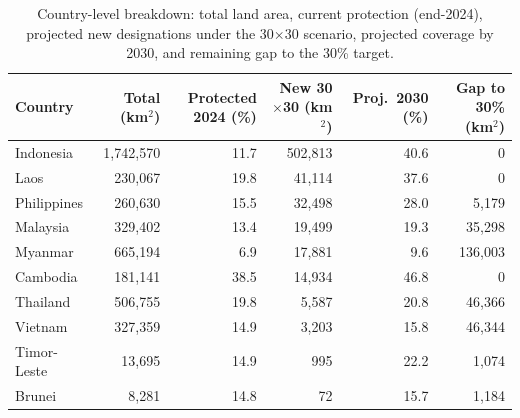 \begin{table}[htbp]
  \centering
  \small
  \caption{Country-level breakdown: total land area, current protection (end-2024), projected new designations under the 30$\times$30 scenario, projected coverage by 2030, and remaining gap to the 30\% target.}
  \label{tab:forward_country}
  \begin{tabular}{lrrrrr}
    \toprule
    Country & Total (km$^2$) & Protected 2024 (\%) & New 30$\times$30 (km$^2$) & Proj.\ 2030 (\%) & Gap to 30\% (km$^2$) \\
    \midrule
    Indonesia & 1,742,570 & 11.7 & 502,813 & 40.6 & 0 \\
    Laos & 230,067 & 19.8 & 41,114 & 37.6 & 0 \\
    Philippines & 260,630 & 15.5 & 32,498 & 28.0 & 5,179 \\
    Malaysia & 329,402 & 13.4 & 19,499 & 19.3 & 35,298 \\
    Myanmar & 665,194 & 6.9 & 17,881 & 9.6 & 136,003 \\
    Cambodia & 181,141 & 38.5 & 14,934 & 46.8 & 0 \\
    Thailand & 506,755 & 19.8 & 5,587 & 20.8 & 46,366 \\
    Vietnam & 327,359 & 14.9 & 3,203 & 15.8 & 46,344 \\
    Timor-Leste & 13,695 & 14.9 & 995 & 22.2 & 1,074 \\
    Brunei & 8,281 & 14.8 & 72 & 15.7 & 1,184 \\
    \bottomrule
  \end{tabular}
\end{table}
